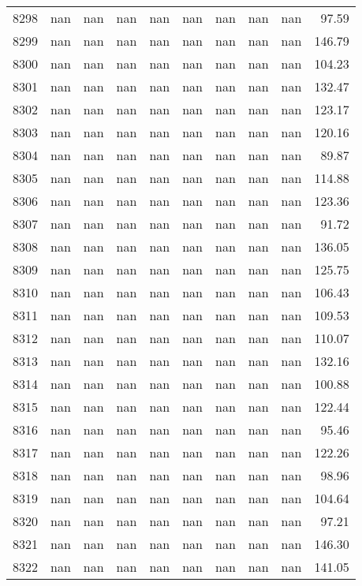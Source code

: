 \begin{tabular}{lrrrrrrrrr}
8298 & nan & nan & nan & nan & nan & nan & nan & nan & 97.59 \\
8299 & nan & nan & nan & nan & nan & nan & nan & nan & 146.79 \\
8300 & nan & nan & nan & nan & nan & nan & nan & nan & 104.23 \\
8301 & nan & nan & nan & nan & nan & nan & nan & nan & 132.47 \\
8302 & nan & nan & nan & nan & nan & nan & nan & nan & 123.17 \\
8303 & nan & nan & nan & nan & nan & nan & nan & nan & 120.16 \\
8304 & nan & nan & nan & nan & nan & nan & nan & nan & 89.87 \\
8305 & nan & nan & nan & nan & nan & nan & nan & nan & 114.88 \\
8306 & nan & nan & nan & nan & nan & nan & nan & nan & 123.36 \\
8307 & nan & nan & nan & nan & nan & nan & nan & nan & 91.72 \\
8308 & nan & nan & nan & nan & nan & nan & nan & nan & 136.05 \\
8309 & nan & nan & nan & nan & nan & nan & nan & nan & 125.75 \\
8310 & nan & nan & nan & nan & nan & nan & nan & nan & 106.43 \\
8311 & nan & nan & nan & nan & nan & nan & nan & nan & 109.53 \\
8312 & nan & nan & nan & nan & nan & nan & nan & nan & 110.07 \\
8313 & nan & nan & nan & nan & nan & nan & nan & nan & 132.16 \\
8314 & nan & nan & nan & nan & nan & nan & nan & nan & 100.88 \\
8315 & nan & nan & nan & nan & nan & nan & nan & nan & 122.44 \\
8316 & nan & nan & nan & nan & nan & nan & nan & nan & 95.46 \\
8317 & nan & nan & nan & nan & nan & nan & nan & nan & 122.26 \\
8318 & nan & nan & nan & nan & nan & nan & nan & nan & 98.96 \\
8319 & nan & nan & nan & nan & nan & nan & nan & nan & 104.64 \\
8320 & nan & nan & nan & nan & nan & nan & nan & nan & 97.21 \\
8321 & nan & nan & nan & nan & nan & nan & nan & nan & 146.30 \\
8322 & nan & nan & nan & nan & nan & nan & nan & nan & 141.05 \\

\end{tabular}
